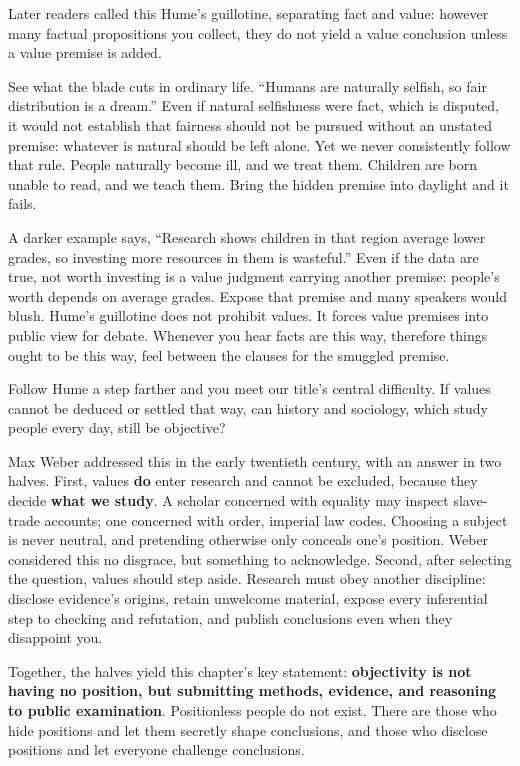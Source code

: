 Later readers called this Hume's guillotine, separating fact and value: however many factual propositions you collect, they do not yield a value conclusion unless a value premise is added.

See what the blade cuts in ordinary life. ``Humans are naturally selfish, so fair distribution is a dream.'' Even if natural selfishness were fact, which is disputed, it would not establish that fairness should not be pursued without an unstated premise: whatever is natural should be left alone. Yet we never consistently follow that rule. People naturally become ill, and we treat them. Children are born unable to read, and we teach them. Bring the hidden premise into daylight and it fails.

A darker example says, ``Research shows children in that region average lower grades, so investing more resources in them is wasteful.'' Even if the data are true, not worth investing is a value judgment carrying another premise: people's worth depends on average grades. Expose that premise and many speakers would blush. Hume's guillotine does not prohibit values. It forces value premises into public view for debate. Whenever you hear facts are this way, therefore things ought to be this way, feel between the clauses for the smuggled premise.

Follow Hume a step farther and you meet our title's central difficulty. If values cannot be deduced or settled that way, can history and sociology, which study people every day, still be objective?

Max Weber addressed this in the early twentieth century, with an answer in two halves. First, values \textbf{do} enter research and cannot be excluded, because they decide \textbf{what we study}. A scholar concerned with equality may inspect slave-trade accounts; one concerned with order, imperial law codes. Choosing a subject is never neutral, and pretending otherwise only conceals one's position. Weber considered this no disgrace, but something to acknowledge. Second, after selecting the question, values should step aside. Research must obey another discipline: disclose evidence's origins, retain unwelcome material, expose every inferential step to checking and refutation, and publish conclusions even when they disappoint you.

Together, the halves yield this chapter's key statement: \textbf{objectivity is not having no position, but submitting methods, evidence, and reasoning to public examination}. Positionless people do not exist. There are those who hide positions and let them secretly shape conclusions, and those who disclose positions and let everyone challenge conclusions.

